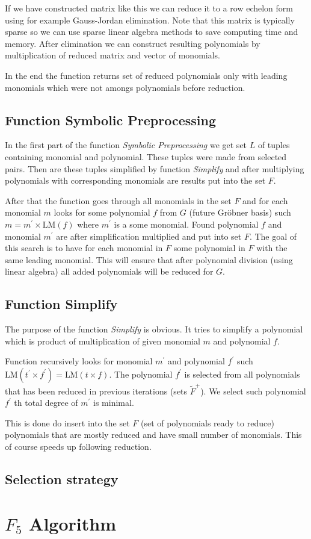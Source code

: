If we have constructed matrix like this we can reduce it to a row echelon form using for example Gauss-Jordan elimination. Note that this matrix is typically sparse so we can use sparse linear algebra methods to save computing time and memory. After elimination we can construct resulting polynomials by multiplication of reduced matrix and vector of monomials.

In the end the function returns set of reduced polynomials only with leading monomials which were not amongs polynomials before reduction.

\subsection{Function Symbolic Preprocessing}
In the first part of the function \textit{Symbolic Preprocessing} we get set $L$ of tuples containing monomial and polynomial. These tuples were made from selected pairs. Then are these tuples simplified by function \textit{Simplify} and after multiplying polynomials with corresponding monomials are results put into the set $F$.

After that the function goes through all monomials in the set $F$ and for each monomial $m$ looks for some polynomial $f$ from $G$ (future Gr\"obner basis) such $m = m^\prime \times \textrm{LM}(f)$ where $m^\prime$ is a some monomial. Found polynomial $f$ and monomial $m^\prime$ are after simplification multiplied and put into set $F$. The goal of this search is to have for each monomial in $F$ some polynomial in $F$ with the same leading monomial. This will ensure that after polynomial division (using linear algebra) all added polynomials will be reduced for $G$.

\subsection{Function Simplify}
The purpose of the function \textit{Simplify} is obvious. It tries to simplify a polynomial which is product of multiplication of given monomial $m$ and polynomial $f$.

Function recursively looks for monomial $m^\prime$ and polynomial $f^\prime$ such $\textrm{LM}(t^\prime\times f^\prime) = \textrm{LM}(t\times f)$. The polynomial $f^\prime$ is selected from all polynomials that has been reduced in previous iterations (sets $\tilde{F}^+$). We select such polynomial $f^\prime$ th total degree of $m^\prime$ is minimal.

This is done do insert into the set $F$ (set of polynomials ready to reduce) polynomials that are mostly reduced and have small number of monomials. This of course speeds up following reduction.

\subsection{Selection strategy}
\label{subsec:F4:sel}

\section{$F_5$ Algorithm}
